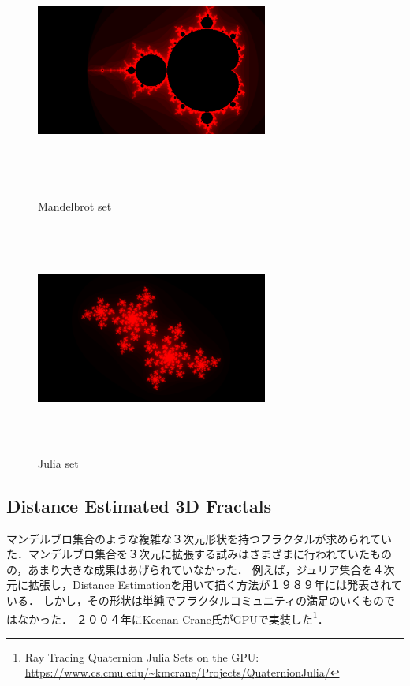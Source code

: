 \begin{figure}[htbp]
 \begin{minipage}{0.49\hsize}
  \begin{center}
   \includegraphics[width=3in, height=3in, keepaspectratio]{../img/fractal/mandelbrot.pdf}
   \caption{Mandelbrot set}
   \label{fig:mandelbrot}
  \end{center}
 \end{minipage}
 \begin{minipage}{0.49\hsize}
     \includegraphics[width=3in, height=3in, keepaspectratio]{../img/fractal/julia.pdf}
   \caption{Julia set}
   \label{fig:julia}
 \end{minipage}
\end{figure}

\subsection{Distance Estimated 3D Fractals}

マンデルブロ集合のような複雑な３次元形状を持つフラクタルが求められていた．マンデルブロ集合を３次元に拡張する試みはさまざまに行われていたものの，あまり大きな成果はあげられていなかった．
例えば，ジュリア集合を４次元に拡張し，Distance Estimationを用いて描く方法が１９８９年には発表されている\cite{4djulia}．
しかし，その形状は単純でフラクタルコミュニティの満足のいくものではなかった．
２００４年にKeenan Crane氏がGPUで実装した\footnote{Ray Tracing Quaternion Julia Sets on the GPU: \url{https://www.cs.cmu.edu/~kmcrane/Projects/QuaternionJulia/}}．

